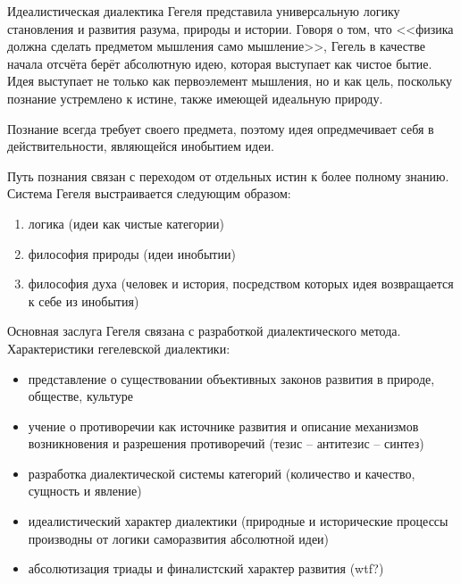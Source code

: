 Идеалистическая диалектика Гегеля представила универсальную логику становления и развития разума, природы и истории. Говоря о том, что <<физика должна сделать предметом мышления само мышление>>, Гегель в качестве начала отсчёта берёт абсолютную идею, которая выступает как чистое бытие. Идея выступает не только как первоэлемент мышления, но и как цель, поскольку познание устремлено к истине, также имеющей идеальную природу.

Познание всегда требует своего предмета, поэтому идея опредмечивает себя в действительности, являющейся инобытием идеи.

Путь познания связан с переходом от отдельных истин к более полному знанию. Система Гегеля выстраивается следующим образом:
\begin{enumerate}
     \item логика (идеи как чистые категории)
     \item философия природы (идеи инобытии)
     \item философия духа (человек и история, посредством которых идея возвращается к себе из инобытия)
 \end{enumerate}

 Основная заслуга Гегеля связана с разработкой диалектического метода. Характеристики гегелевской диалектики:
 \begin{itemize}
     \item представление о существовании объективных законов развития в природе, обществе, культуре
     \item учение о противоречии как источнике развития и описание механизмов возникновения и разрешения противоречий (тезис -- антитезис -- синтез)
     \item разработка диалектической системы категорий (количество и качество, сущность и явление)
     \item идеалистический характер диалектики (природные и исторические процессы производны от логики саморазвития абсолютной идеи)
     \item абсолютизация триады и финалистский характер развития (wtf?)
 \end{itemize}